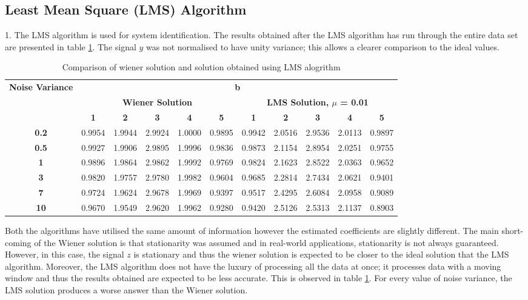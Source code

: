 \documentclass{article}
\begin{document}
\subsection{Least Mean Square (LMS) Algorithm}

1. The LMS algorithm is used for system identification. The results obtained after the LMS algorithm has run through the entire data set are presented in table \ref{tab:lms}. The signal $y$ was not normalised to have unity variance; this allows a clearer comparison to the ideal values.

\begin{table}[H]
  \centering
    \begin{tabular}{|c|c|c|c|c|c|c|c|c|c|c|}
    \hline
    \multirow{3}{*}{\textbf{Noise Variance}} & \multicolumn{10}{c|}{\textbf{b}} \\
\cline{2-11}          & \multicolumn{5}{c|}{\textbf{Wiener Solution}} & \multicolumn{5}{c|}{\textbf{LMS Solution, $\mu$ = 0.01}} \\
\cline{2-11}          & \textbf{1} & \textbf{2} & \textbf{3} & \textbf{4} & \textbf{5} & \textbf{1} & \textbf{2} & \textbf{3} & \textbf{4} & \textbf{5} \\
    \hline
    \textbf{0.2}  & 0.9954 & 1.9944 & 2.9924 & 1.0000 & 0.9895 & 0.9942 & 2.0516 & 2.9536 & 2.0113 & 0.9897 \\
    \hline
    \textbf{0.5}& 0.9927 & 1.9906 & 2.9895 & 1.9996 & 0.9836 & 0.9873 & 2.1154 & 2.8954 & 2.0251 & 0.9755 \\
    \hline
    \textbf{1} & 0.9896 & 1.9864 & 2.9862 & 1.9992 & 0.9769 & 0.9824 & 2.1623 & 2.8522 & 2.0363 & 0.9652 \\
    \hline
    \textbf{3} & 0.9820 & 1.9757 & 2.9780 & 1.9982 & 0.9604 & 0.9685 & 2.2814 & 2.7434 & 2.0621 & 0.9401\\
    \hline
    \textbf{7}& 0.9724 & 1.9624 & 2.9678 & 1.9969 & 0.9397 & 0.9517 & 2.4295 & 2.6084 & 2.0958 & 0.9089 \\
    \hline
    \textbf{10}  & 0.9670 & 1.9549 &2.9620 & 1.9962 & 0.9280 & 0.9420 & 2.5126 & 2.5313 & 2.1137 & 0.8903 \\
    \hline
    \end{tabular}%
  \caption{Comparison of wiener solution and solution obtained using LMS alogrithm}
  \label{tab:lms}%
\end{table}%


Both the algorithms have utilised the same amount of information however the estimated coefficients are slightly different. The main short-coming of the Wiener solution is that stationarity was assumed and in real-world applications, stationarity is not always guaranteed. However, in this case, the signal $z$ is stationary and thus the wiener solution is expected to be closer to the ideal solution that the LMS algorithm. Moreover, the LMS algorithm does not have the luxury of processing all the data at once; it processes data with a moving window and thus the results obtained are expected to be less accurate. This is observed in table \ref{tab:lms}. For every value of noise variance, the LMS solution produces a worse answer than the Wiener solution. \\
\end{document}
